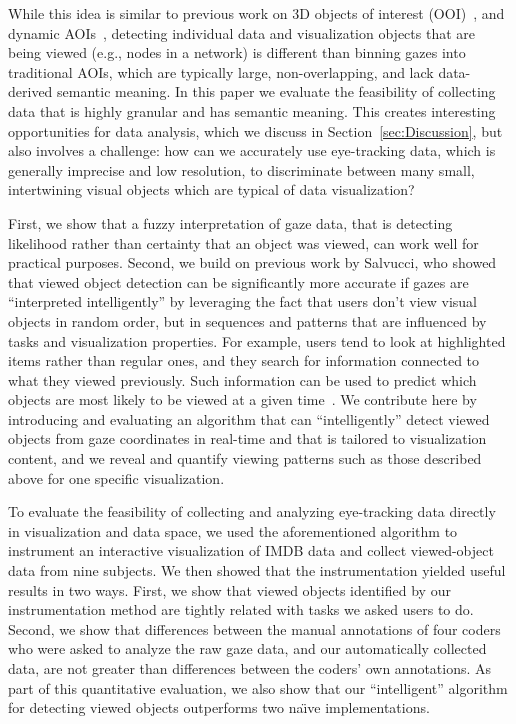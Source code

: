 While this idea is similar to previous work on 3D objects of interest (OOI)~\cite{stellmach20103d}, and  dynamic AOIs~\cite{papenmeier2010dynaoi}, detecting individual data and visualization objects that are being viewed (e.g., nodes in a network) is different than binning gazes into traditional AOIs, which are typically large, non-overlapping, and lack data-derived semantic meaning. In this paper we evaluate the feasibility of collecting data that is highly granular and has semantic meaning. This creates interesting opportunities for data analysis, which we discuss in Section~\ref{sec:Discussion}, but also involves a challenge: how can we accurately use eye-tracking data, which is generally imprecise and low resolution, to discriminate between many small, intertwining visual objects which are typical of data visualization? 

First, we show that a fuzzy interpretation of gaze data, that is detecting likelihood rather than certainty that an object was viewed, can work well for practical purposes. Second, we build on previous work by Salvucci, who showed that viewed object detection can be significantly more accurate if gazes are ``interpreted intelligently'' by leveraging the fact that users don't view visual objects in random order, but in sequences and patterns that are influenced by tasks and visualization properties. For example, users tend to look at highlighted items rather than regular ones, and they search for information connected to what they viewed previously. Such information can be used to predict which objects are most likely to be viewed at a given time~\cite{salvucci1999inferring, salvucci2000intelligent}. We contribute here by introducing and evaluating an algorithm that can ``intelligently'' detect viewed objects from gaze coordinates in real-time and that is tailored to visualization content, and we reveal and quantify viewing patterns such as those described above for one specific visualization. 

To evaluate the feasibility of collecting and analyzing eye-tracking data directly in visualization and data space,  we used the aforementioned algorithm to instrument an interactive visualization of IMDB data and collect viewed-object data from nine subjects. We then showed that the instrumentation yielded useful results in two ways. First, we show that viewed objects identified by our instrumentation method are tightly related with tasks we asked users to do. Second, we show that differences between the manual annotations of four coders who were asked to analyze the raw gaze data, and our automatically collected data, are not greater than differences between the coders' own annotations. As part of this quantitative evaluation, we also show that our ``intelligent'' algorithm for detecting viewed objects outperforms two na\"{\i}ve implementations. 

